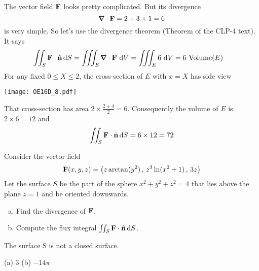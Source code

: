 \begin{solution} 
The vector field $\mathbf{F}$ looks pretty complicated. But its divergence
\begin{equation*}
\vnabla\cdot\vF = 2 + 3 + 1 = 6
\end{equation*}
is very simple. So let's use the divergence theorem
(Theorem  of the CLP-4 text). It says
\begin{align*}
\dblInt_S \vF\cdot\hn\,\dee{S}
&=\tripInt_E \vnabla\cdot\vF\ \dee{V}
=\tripInt_E 6\ \dee{V}
=6\ \text{Volume}(E)
\end{align*}
For any fixed $0\le X\le 2$, the cross-section of $E$ with $x=X$ has side view
\begin{center}
     \texttt{[image: OE16D\_8.pdf]}
\end{center}
That cross-section has area $2\times \frac{2+4}{2}=6$. Consequently the 
volume of $E$ is $2\times 6=12$ and
\begin{equation*}
\iint_S \mathbf{F}\cdot\hat{\mathbf{n}}\,\mathrm{d}S
=6\times 12
=72
\end{equation*}
\end{solution}

\begin{question}[M317 2017A] %
Consider the vector field
\begin{equation*}
 \mathbf{F}(x, y, z) = \big(z \arctan(y^2)\,,\, z^3 \ln(x^2 + 1)\,,\, 3z\big)
\end{equation*}
Let the surface $S$ be the part of the sphere $x^2 + y^2 + z^2 = 4$ 
that lies above the plane $z = 1$ and be oriented downwards.
\begin{enumerate}[(a)]
\item
Find the divergence of $\mathbf{F}$.

\item
Compute the flux integral $\iint_S \mathbf{F} \cdot\hat{\mathbf{n}}\,\mathrm{d}S$.

\end{enumerate}
\end{question}

\begin{hint} 
The surface S is not a closed surface.
\end{hint}

\begin{answer} 
(a) $3$\qquad
(b) $-14\pi$
\end{answer}

